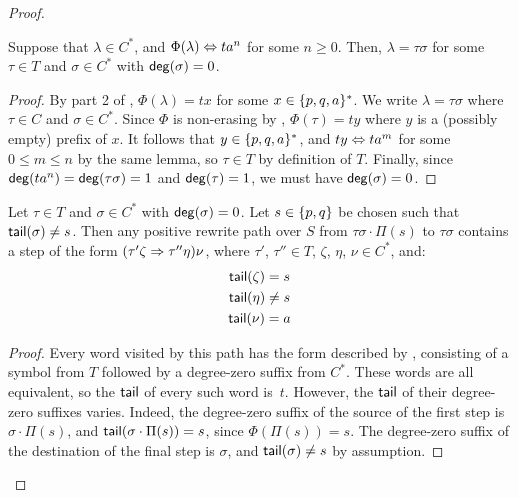 \documentclass[../generics]{subfiles}
\begin{document}
\begin{proof}
\begin{lemma}\label{lemma:t a decoding}
Suppose that $\lambda \in C^*$, and $\Phi(\lambda) \Leftrightarrow ta^n$ for some $n \geq 0$. Then, $\lambda = \tau \sigma$ for some $\tau \in T$ and $\sigma \in C^*$ with $\mathsf{deg}(\sigma)=0$.
\end{lemma}
\begin{proof}
By part 2 of , $\Phi(\lambda) = tx$ for some $x \in \{p,q,a\}^*$. We write $\lambda = \tau \sigma$ where $\tau \in C$ and $\sigma \in C^*$. Since $\Phi$ is non-erasing by , $\Phi(\tau)=ty$ where $y$ is a (possibly empty) prefix of $x$. It follows that $y \in \{p,q,a\}^*$, and $ty \Leftrightarrow ta^m$ for some $0 \leq m \leq n$ by the same lemma, so $\tau \in T$ by definition of $T$. Finally, since $\mathsf{deg}(ta^n)=\mathsf{deg}(\tau\sigma)=1$ and $\mathsf{deg}(\tau)=1$, we must have $\mathsf{deg}(\sigma)=0$.
\end{proof}

\begin{lemma}\label{lemma:tpqa tail change}
Let $\tau \in T$ and $\sigma \in C^*$ with $\mathsf{deg}(\sigma)=0$. Let $s \in \{p,q\}$ be chosen such that $\mathsf{tail}(\sigma) \neq s$. Then any positive rewrite path over $S$ from $\tau\sigma \cdot \Pi(s)$ to $\tau\sigma$ contains a step of the form $( \tau' \zeta \Rightarrow \tau'' \eta ) \nu$, where $\tau'$, $\tau'' \in T$, $\zeta$, $\eta$, $\nu \in C^*$, and:
\begin{gather*}
\mathsf{tail}(\zeta) = s \\
\mathsf{tail}(\eta) \neq s \\
\mathsf{tail}(\nu) = a
\end{gather*}
\end{lemma}
\begin{proof}
Every word visited by this path has the form described by , consisting of a symbol from $T$ followed by a degree-zero suffix from $C^*$. These words are all equivalent, so the $\mathsf{tail}$ of every such word is~$t$. However, the $\mathsf{tail}$ of their degree-zero suffixes varies. Indeed, the degree-zero suffix of the source of the first step is $\sigma \cdot \Pi(s)$, and $\mathsf{tail}(\sigma \cdot \Pi(s))=s$, since $\Phi(\Pi(s))=s$. The degree-zero suffix of the destination of the final step is $\sigma$, and $\mathsf{tail}(\sigma)\neq s$ by assumption.


\end{proof}
\end{proof}
\end{document}
